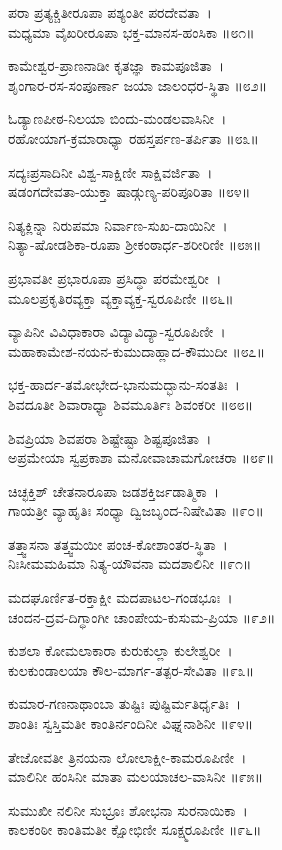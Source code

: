 ಪರಾ ಪ್ರತ್ಯಕ್ಚಿತೀರೂಪಾ ಪಶ್ಯಂತೀ ಪರದೇವತಾ~।\\
ಮಧ್ಯಮಾ ವೈಖರೀರೂಪಾ ಭಕ್ತ-ಮಾನಸ-ಹಂಸಿಕಾ ॥೮೧॥

ಕಾಮೇಶ್ವರ-ಪ್ರಾಣನಾಡೀ ಕೃತಜ್ಞಾ ಕಾಮಪೂಜಿತಾ~।\\
ಶೃಂಗಾರ-ರಸ-ಸಂಪೂರ್ಣಾ ಜಯಾ ಜಾಲಂಧರ-ಸ್ಥಿತಾ ॥೮೨॥

ಓಡ್ಯಾಣಪೀಠ-ನಿಲಯಾ ಬಿಂದು-ಮಂಡಲವಾಸಿನೀ~।\\
ರಹೋಯಾಗ-ಕ್ರಮಾರಾಧ್ಯಾ ರಹಸ್ತರ್ಪಣ-ತರ್ಪಿತಾ ॥೮೩॥

ಸದ್ಯಃಪ್ರಸಾದಿನೀ ವಿಶ್ವ-ಸಾಕ್ಷಿಣೀ ಸಾಕ್ಷಿವರ್ಜಿತಾ~।\\
ಷಡಂಗದೇವತಾ-ಯುಕ್ತಾ ಷಾಡ್ಗುಣ್ಯ-ಪರಿಪೂರಿತಾ ॥೮೪॥

ನಿತ್ಯಕ್ಲಿನ್ನಾ ನಿರುಪಮಾ ನಿರ್ವಾಣ-ಸುಖ-ದಾಯಿನೀ~।\\
ನಿತ್ಯಾ-ಷೋಡಶಿಕಾ-ರೂಪಾ ಶ್ರೀಕಂಠಾರ್ಧ-ಶರೀರಿಣೀ ॥೮೫॥

ಪ್ರಭಾವತೀ ಪ್ರಭಾರೂಪಾ ಪ್ರಸಿದ್ಧಾ ಪರಮೇಶ್ವರೀ~।\\
ಮೂಲಪ್ರಕೃತಿರವ್ಯಕ್ತಾ ವ್ಯಕ್ತಾವ್ಯಕ್ತ-ಸ್ವರೂಪಿಣೀ ॥೮೬॥

ವ್ಯಾಪಿನೀ  ವಿವಿಧಾಕಾರಾ ವಿದ್ಯಾವಿದ್ಯಾ-ಸ್ವರೂಪಿಣೀ~।\\
ಮಹಾಕಾಮೇಶ-ನಯನ-ಕುಮುದಾಹ್ಲಾದ-ಕೌಮುದೀ ॥೮೭॥

ಭಕ್ತ-ಹಾರ್ದ-ತಮೋಭೇದ-ಭಾನುಮದ್ಭಾನು-ಸಂತತಿಃ~।\\
ಶಿವದೂತೀ ಶಿವಾರಾಧ್ಯಾ ಶಿವಮೂರ್ತಿಃ ಶಿವಂಕರೀ ॥೮೮॥

ಶಿವಪ್ರಿಯಾ ಶಿವಪರಾ ಶಿಷ್ಟೇಷ್ಟಾ ಶಿಷ್ಟಪೂಜಿತಾ~।\\
ಅಪ್ರಮೇಯಾ ಸ್ವಪ್ರಕಾಶಾ ಮನೋವಾಚಾಮಗೋಚರಾ ॥೮೯॥

ಚಿಚ್ಛಕ್ತಿಶ್ ಚೇತನಾರೂಪಾ ಜಡಶಕ್ತಿರ್ಜಡಾತ್ಮಿಕಾ~।\\
ಗಾಯತ್ರೀ ವ್ಯಾಹೃತಿಃ ಸಂಧ್ಯಾ ದ್ವಿಜಬೃಂದ-ನಿಷೇವಿತಾ ॥೯೦॥

ತತ್ತ್ವಾಸನಾ ತತ್ತ್ವಮಯೀ ಪಂಚ-ಕೋಶಾಂತರ-ಸ್ಥಿತಾ~।\\
ನಿಃಸೀಮಮಹಿಮಾ ನಿತ್ಯ-ಯೌವನಾ ಮದಶಾಲಿನೀ ॥೯೧॥

ಮದಘೂರ್ಣಿತ-ರಕ್ತಾಕ್ಷೀ ಮದಪಾಟಲ-ಗಂಡಭೂಃ~।\\
ಚಂದನ-ದ್ರವ-ದಿಗ್ಧಾಂಗೀ ಚಾಂಪೇಯ-ಕುಸುಮ-ಪ್ರಿಯಾ ॥೯೨॥

ಕುಶಲಾ ಕೋಮಲಾಕಾರಾ ಕುರುಕುಲ್ಲಾ ಕುಲೇಶ್ವರೀ~।\\
ಕುಲಕುಂಡಾಲಯಾ ಕೌಲ-ಮಾರ್ಗ-ತತ್ಪರ-ಸೇವಿತಾ ॥೯೩॥

ಕುಮಾರ-ಗಣನಾಥಾಂಬಾ ತುಷ್ಟಿಃ ಪುಷ್ಟಿರ್ಮತಿರ್ಧೃತಿಃ~।\\
ಶಾಂತಿಃ ಸ್ವಸ್ತಿಮತೀ ಕಾಂತಿರ್ನಂದಿನೀ ವಿಘ್ನನಾಶಿನೀ ॥೯೪॥

ತೇಜೋವತೀ ತ್ರಿನಯನಾ ಲೋಲಾಕ್ಷೀ-ಕಾಮರೂಪಿಣೀ~।\\
ಮಾಲಿನೀ ಹಂಸಿನೀ ಮಾತಾ ಮಲಯಾಚಲ-ವಾಸಿನೀ ॥೯೫॥

ಸುಮುಖೀ ನಲಿನೀ ಸುಭ್ರೂಃ ಶೋಭನಾ ಸುರನಾಯಿಕಾ~।\\
ಕಾಲಕಂಠೀ ಕಾಂತಿಮತೀ ಕ್ಷೋಭಿಣೀ ಸೂಕ್ಷ್ಮರೂಪಿಣೀ ॥೯೬॥

